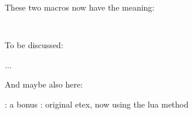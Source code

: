 These two macros now have the meaning:

\startlines \tt
\meaning\MyMacroA
\meaning\MyMacroB
\stoplines

\stopsection

\startsection[title={\LUAMETATEX\ primitives}]

To be discussed:

\starttyping
\expand
\expandtoken
\localcontrol
\localcontrolled
\beginlocalcontrol ... \endlocalcontrol
\immediate
\stoptyping

And maybe also here:

\starttyping
\tokenized  : a bonus
\scantokens : original etex, now using the lua method
\stoptyping


\stopsection

\stopdocument

